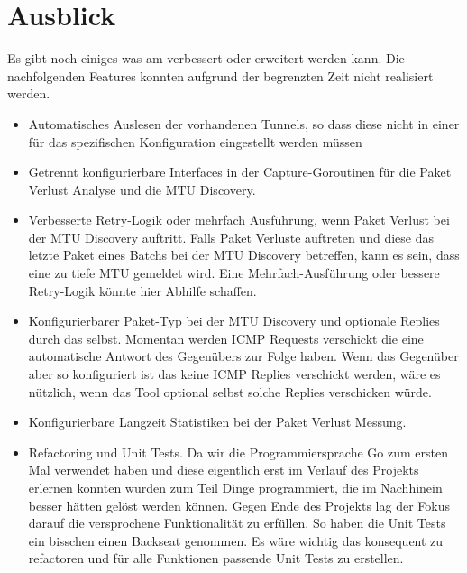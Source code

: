 \chapter{Ausblick}
\label{chap:Ausblick}

Es gibt noch einiges was am \tool{} verbessert oder erweitert werden kann. Die nachfolgenden Features konnten aufgrund der begrenzten Zeit nicht realisiert werden.

\begin{itemize}
\item Automatisches Auslesen der vorhandenen Tunnels, so dass diese nicht in einer für das \tool{} spezifischen Konfiguration eingestellt werden müssen

\item Getrennt konfigurierbare Interfaces in der Capture-Goroutinen für die Paket Verlust Analyse und die MTU Discovery.

\item Verbesserte Retry-Logik oder mehrfach Ausführung, wenn Paket Verlust bei der MTU Discovery auftritt. Falls Paket Verluste auftreten und diese das letzte Paket eines Batchs bei der MTU Discovery betreffen, kann es sein, dass eine zu tiefe MTU gemeldet wird. Eine Mehrfach-Ausführung oder bessere Retry-Logik könnte hier Abhilfe schaffen.

\item Konfigurierbarer Paket-Typ bei der MTU Discovery und optionale Replies durch das \tool{} selbst. Momentan werden ICMP Requests verschickt die eine automatische Antwort des Gegenübers zur Folge haben. Wenn das Gegenüber aber so konfiguriert ist das keine ICMP Replies verschickt werden, wäre es nützlich, wenn das Tool optional selbst solche Replies verschicken würde.

\item Konfigurierbare Langzeit Statistiken bei der Paket Verlust Messung.

\item Refactoring und Unit Tests. Da wir die Programmiersprache Go zum ersten Mal verwendet haben und diese eigentlich erst im Verlauf des Projekts erlernen konnten wurden zum Teil Dinge programmiert, die im Nachhinein besser hätten gelöst werden können. Gegen Ende des Projekts lag der Fokus darauf die versprochene Funktionalität zu erfüllen. So haben die Unit Tests ein bisschen einen Backseat genommen. Es wäre wichtig das \tool{} konsequent zu refactoren und für alle Funktionen passende Unit Tests zu erstellen.


\end{itemize}